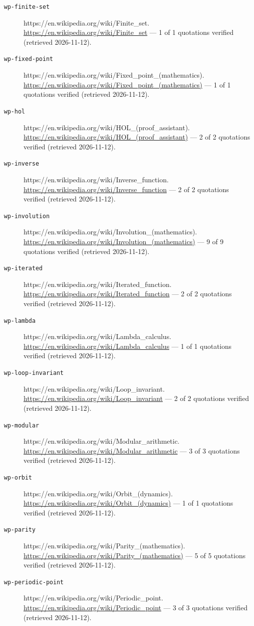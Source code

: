 \documentclass[11pt,letterpaper,openright]{book}
\begin{document}
\begin{description}
\item[\texttt{wp-finite-set}] https://en.wikipedia.org/wiki/Finite\_set. \url{https://en.wikipedia.org/wiki/Finite_set} --- 1 of 1 quotations verified (retrieved 2026-11-12).
\item[\texttt{wp-fixed-point}] https://en.wikipedia.org/wiki/Fixed\_point\_(mathematics). \url{https://en.wikipedia.org/wiki/Fixed_point_(mathematics)} --- 1 of 1 quotations verified (retrieved 2026-11-12).
\item[\texttt{wp-hol}] https://en.wikipedia.org/wiki/HOL\_(proof\_assistant). \url{https://en.wikipedia.org/wiki/HOL_(proof_assistant)} --- 2 of 2 quotations verified (retrieved 2026-11-12).
\item[\texttt{wp-inverse}] https://en.wikipedia.org/wiki/Inverse\_function. \url{https://en.wikipedia.org/wiki/Inverse_function} --- 2 of 2 quotations verified (retrieved 2026-11-12).
\item[\texttt{wp-involution}] https://en.wikipedia.org/wiki/Involution\_(mathematics). \url{https://en.wikipedia.org/wiki/Involution_(mathematics)} --- 9 of 9 quotations verified (retrieved 2026-11-12).
\item[\texttt{wp-iterated}] https://en.wikipedia.org/wiki/Iterated\_function. \url{https://en.wikipedia.org/wiki/Iterated_function} --- 2 of 2 quotations verified (retrieved 2026-11-12).
\item[\texttt{wp-lambda}] https://en.wikipedia.org/wiki/Lambda\_calculus. \url{https://en.wikipedia.org/wiki/Lambda_calculus} --- 1 of 1 quotations verified (retrieved 2026-11-12).
\item[\texttt{wp-loop-invariant}] https://en.wikipedia.org/wiki/Loop\_invariant. \url{https://en.wikipedia.org/wiki/Loop_invariant} --- 2 of 2 quotations verified (retrieved 2026-11-12).
\item[\texttt{wp-modular}] https://en.wikipedia.org/wiki/Modular\_arithmetic. \url{https://en.wikipedia.org/wiki/Modular_arithmetic} --- 3 of 3 quotations verified (retrieved 2026-11-12).
\item[\texttt{wp-orbit}] https://en.wikipedia.org/wiki/Orbit\_(dynamics). \url{https://en.wikipedia.org/wiki/Orbit_(dynamics)} --- 1 of 1 quotations verified (retrieved 2026-11-12).
\item[\texttt{wp-parity}] https://en.wikipedia.org/wiki/Parity\_(mathematics). \url{https://en.wikipedia.org/wiki/Parity_(mathematics)} --- 5 of 5 quotations verified (retrieved 2026-11-12).
\item[\texttt{wp-periodic-point}] https://en.wikipedia.org/wiki/Periodic\_point. \url{https://en.wikipedia.org/wiki/Periodic_point} --- 3 of 3 quotations verified (retrieved 2026-11-12).

\end{description}
\end{document}
